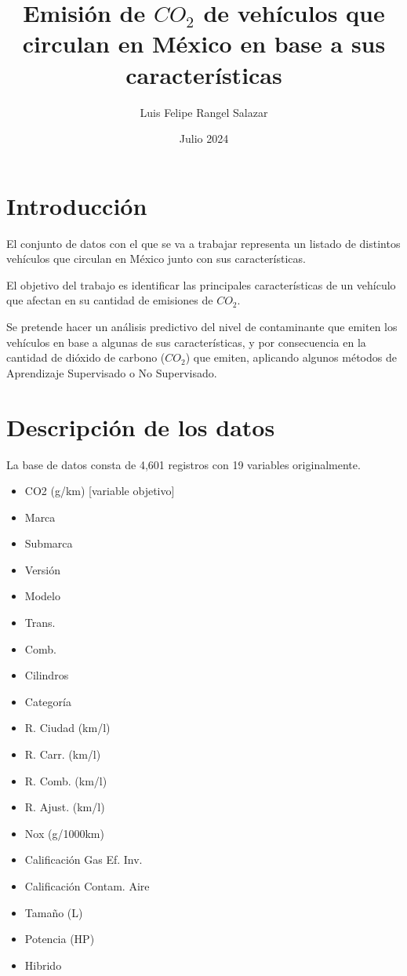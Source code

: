 \documentclass{article}
\title{Emisión de $CO_2$ de vehículos que circulan en México en base a sus características}
\author{Luis Felipe Rangel Salazar}
\date{Julio 2024}
\begin{document}
\maketitle

\section{Introducción}

El conjunto de datos con el que se va a trabajar representa un listado de distintos vehículos que circulan en México junto con sus características.

El objetivo del trabajo es identificar las principales características de un vehículo que afectan en su cantidad de emisiones de $CO_2$.

Se pretende hacer un análisis predictivo del nivel de contaminante que emiten los vehículos en base a algunas de sus características, y por consecuencia en la cantidad de dióxido de carbono ($CO_2$) que emiten, aplicando algunos métodos de Aprendizaje Supervisado o No Supervisado.



\section{Descripción de los datos}

La base de datos consta de 4,601 registros con 19 variables originalmente.

\begin{itemize}
    \item CO2 (g/km) [variable objetivo]
    \item Marca
    \item Submarca
    \item Versión
    \item Modelo
    \item Trans.
    \item Comb.
    \item Cilindros
    \item Categoría
    \item R. Ciudad (km/l)
    \item R. Carr. (km/l)
    \item R. Comb. (km/l)
    \item R. Ajust. (km/l)
    \item Nox (g/1000km)
    \item Calificación Gas Ef. Inv.
    \item Calificación Contam. Aire
    \item Tamaño (L)
    \item Potencia (HP)
    \item Hibrido 
\end{itemize}
\end{document}
